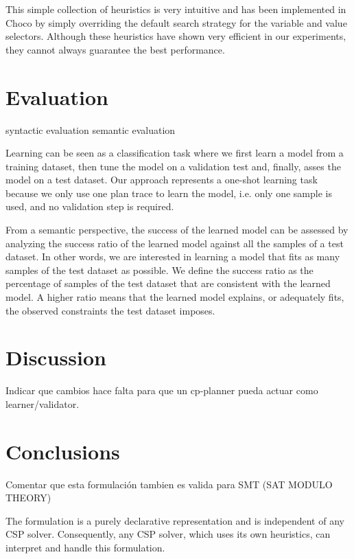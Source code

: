 \documentclass[runningheads]{llncs}
\begin{document}
This simple collection of heuristics is very intuitive and has been implemented in \textsf{Choco} by simply overriding the default search strategy for the variable and value selectors. Although these heuristics have shown very efficient in our experiments, they cannot always guarantee the best performance.


\section{Evaluation}
\label{sec:evaluation}

syntactic evaluation
semantic evaluation


Learning can be seen as a classification task where we first learn a model from a training dataset, then tune the model on a validation test and, finally, asses the model on a test dataset. Our approach represents a one-shot learning task because we only use one plan trace to learn the model, i.e. only one sample is used, and no validation step is required.

From a semantic perspective, the success of the learned model can be assessed by analyzing the success ratio of the learned model against all the samples of a test dataset. In other words, we are interested in learning a model that fits as many samples of the test dataset as possible. We define the success ratio as the percentage of samples of the test dataset that are consistent with the learned model. A higher ratio means that the learned model explains, or adequately fits, the observed constraints the test dataset imposes.




\section{Discussion}
\label{sec:discussion}

Indicar que cambios hace falta para que un cp-planner pueda actuar como learner/validator.


\section{Conclusions}
\label{sec:conclusions}


Comentar que esta formulación tambien es valida para SMT (SAT MODULO THEORY)


The formulation is a purely declarative representation and is independent of
any CSP solver. Consequently, any CSP solver, which uses its own heuristics, can interpret and handle this
formulation.
\end{document}
